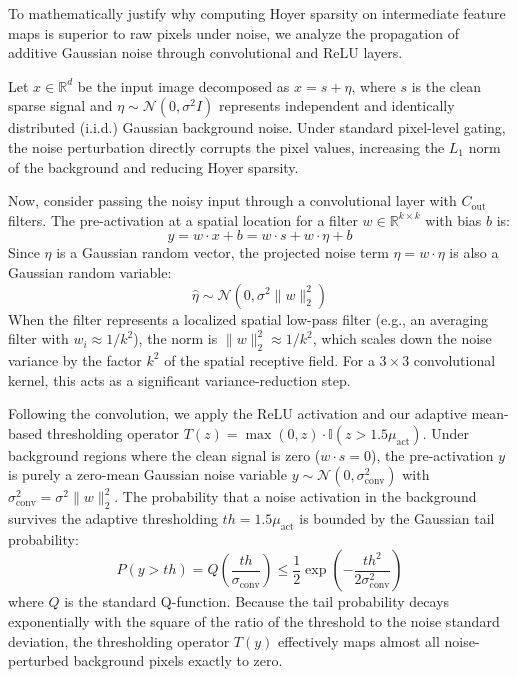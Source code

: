 \documentclass{article}
\theoremstyle{plain}
\theoremstyle{definition}
\theoremstyle{remark}
\begin{document}
To mathematically justify why computing Hoyer sparsity on intermediate feature maps is superior to raw pixels under noise, we analyze the propagation of additive Gaussian noise through convolutional and ReLU layers.

Let $x \in \mathbb{R}^d$ be the input image decomposed as $x = s + \eta$, where $s$ is the clean sparse signal and $\eta \sim \mathcal{N}(0, \sigma^2 I)$ represents independent and identically distributed (i.i.d.) Gaussian background noise. Under standard pixel-level gating, the noise perturbation directly corrupts the pixel values, increasing the $L_1$ norm of the background and reducing Hoyer sparsity.

Now, consider passing the noisy input through a convolutional layer with $C_{\text{out}}$ filters. The pre-activation at a spatial location for a filter $w \in \mathbb{R}^{k \times k}$ with bias $b$ is:
\begin{equation}
    y = w \cdot x + b = w \cdot s + w \cdot \eta + b
\end{equation}
Since $\eta$ is a Gaussian random vector, the projected noise term $\hat{\eta} = w \cdot \eta$ is also a Gaussian random variable:
\begin{equation}
    \hat{\eta} \sim \mathcal{N}\left(0, \sigma^2 \|w\|_2^2\right)
\end{equation}
When the filter represents a localized spatial low-pass filter (e.g., an averaging filter with $w_{i} \approx 1/k^2$), the norm is $\|w\|_2^2 \approx 1/k^2$, which scales down the noise variance by the factor $k^2$ of the spatial receptive field. For a $3 \times 3$ convolutional kernel, this acts as a significant variance-reduction step.

Following the convolution, we apply the ReLU activation and our adaptive mean-based thresholding operator $T(z) = \max(0, z) \cdot \mathbb{I}(z > 1.5 \mu_{\text{act}})$. Under background regions where the clean signal is zero ($w \cdot s = 0$), the pre-activation $y$ is purely a zero-mean Gaussian noise variable $y \sim \mathcal{N}(0, \sigma^2_{\text{conv}})$ with $\sigma^2_{\text{conv}} = \sigma^2 \|w\|_2^2$. The probability that a noise activation in the background survives the adaptive thresholding $th = 1.5 \mu_{\text{act}}$ is bounded by the Gaussian tail probability:
\begin{equation}
    P(y > th) = Q\left(\frac{th}{\sigma_{\text{conv}}}\right) \le \frac{1}{2} \exp\left( -\frac{th^2}{2 \sigma^2_{\text{conv}}} \right)
\end{equation}
where $Q$ is the standard Q-function. Because the tail probability decays exponentially with the square of the ratio of the threshold to the noise standard deviation, the thresholding operator $T(y)$ effectively maps almost all noise-perturbed background pixels exactly to zero.
\end{document}
